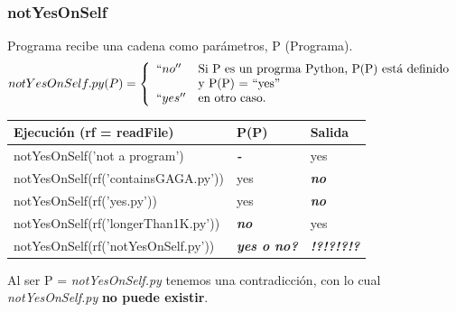 \documentclass[xcolor=table]{beamer}
\begin{document}
\begin{frame}  \frametitle{notYesOnSelf}  \footnotesize  

Programa recibe una cadena como parámetros,  P (Programa). 
\begin{equation}
     \label{ew:notYesOnSelf}
     notYesOnSelf.py (P) =  \left\{
	       \begin{array}{ll}
		 ``no''      & \text{Si P es un progrma Python, P(P) está definido } \\
                     &   \text{y P(P) = ``yes''} \\
		 ``yes''       & \text{en otro caso.} \\
	       \end{array}
	     \right.
   \end{equation}


    \begin{table}[]
    \begin{tabular}{|l|l|l|}
    \hline
    \rowcolor[HTML]{EFEFEF} 
    {\color[HTML]{000000} \textbf{Ejecución (rf = readFile)}} & {\color[HTML]{000000} \textbf{P(P)}}   & {\color[HTML]{000000} \textbf{Salida}}             \\ \hline\hline
    notYesOnSelf('not a program')   & \color[HTML]{FE0000} \textit{\textbf{-}}  & yes  \\ \hline\hline
    notYesOnSelf(rf('containsGAGA.py'))     & yes        & \color[HTML]{FE0000} \textit{\textbf{no}} \\ \hline\hline
    notYesOnSelf(rf('yes.py'))                & yes      & \color[HTML]{FE0000} \textit{\textbf{no}} \\ \hline\hline
    notYesOnSelf(rf('longerThan1K.py')) & \color[HTML]{FE0000} \textit{\textbf{no}} & yes \\ \hline\hline
    notYesOnSelf(rf('notYesOnSelf.py'))  & \color[HTML]{FE0000} \textit{\textbf{yes o no?}}  & \color[HTML]{FE0000} \textit{\textbf{!?!?!?!?}}  \\ \hline
    \end{tabular}
\end{table}
Al ser P = \textit{notYesOnSelf.py} tenemos una contradicción, con lo cual \textit{notYesOnSelf.py} \large{\textbf{no puede existir}}.

\end{frame} 
\end{document}
